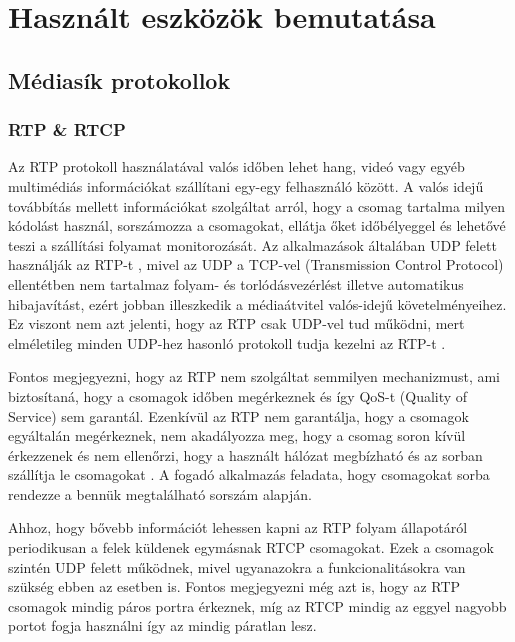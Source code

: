 \chapter{Használt eszközök bemutatása}

\section{Médiasík protokollok}

\subsection{RTP \& RTCP}

Az RTP protokoll használatával valós időben lehet hang, videó vagy egyéb multimédiás 
információkat szállítani egy-egy felhasználó között. A valós idejű továbbítás mellett
információkat szolgáltat arról, hogy a csomag tartalma milyen kódolást használ, 
sorszámozza a csomagokat, ellátja őket időbélyeggel és lehetővé teszi a szállítási 
folyamat monitorozását. Az alkalmazások általában UDP felett használják az RTP-t 
\cite{RFC3550}, mivel az UDP a TCP-vel (Transmission Control Protocol) ellentétben nem 
tartalmaz folyam- és torlódásvezérlést illetve automatikus hibajavítást, ezért jobban 
illeszkedik a médiaátvitel valós-idejű követelményeihez. Ez viszont nem azt jelenti, hogy 
az RTP csak UDP-vel tud működni, mert elméletileg minden UDP-hez hasonló protokoll tudja 
kezelni az RTP-t \cite{RFC3550}.

Fontos megjegyezni, hogy az RTP nem szolgáltat semmilyen mechanizmust, ami biztosítaná,
hogy a csomagok időben megérkeznek és így QoS-t (Quality of Service) sem garantál. 
Ezenkívül az RTP nem garantálja, hogy a csomagok egyáltalán megérkeznek, nem akadályozza 
meg, hogy a csomag soron kívül érkezzenek és nem ellenőrzi, hogy a használt hálózat 
megbízható és az sorban szállítja le csomagokat \cite{RFC3550}. A fogadó alkalmazás 
feladata, hogy csomagokat sorba rendezze a bennük megtalálható sorszám alapján.

Ahhoz, hogy bővebb információt lehessen kapni az RTP folyam állapotáról periodikusan a 
felek küldenek egymásnak RTCP csomagokat. Ezek a csomagok szintén UDP felett működnek,
mivel ugyanazokra a funkcionalitásokra van szükség ebben az esetben is. Fontos megjegyezni
még azt is, hogy az RTP csomagok mindig páros portra érkeznek, míg az RTCP mindig az eggyel nagyobb portot fogja használni így az mindig páratlan lesz.

